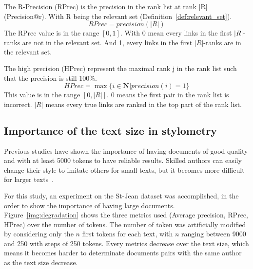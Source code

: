 \begin{definition}
  The R-Precision (RPrec) is the precision in the rank list at rank |R| (Precision@r).
  With R being the relevant set (Definition~\ref{def:relevant_set}).
  \begin{equation}
    RPrec = precision(|R|)
  \end{equation}
  The RPrec value is in the range $\left[0, 1\right]$.
  With 0 mean every links in the first $|R|$-ranks are not in the relevant set.
  And 1, every links in the first $|R|$-ranks are in the relevant set.
\end{definition}

\begin{definition}
  The high precision (HPrec) represent the maximal rank j in the rank list such that the precision is still 100\%.
  \begin{equation}
    HPrec = \max\{i \in \mathbf{N} | precision(i) = 1\}
  \end{equation}
  This value is in the range $\left[0, |R|\right]$.
  $0$ means the first pair in the rank list is incorrect.
  $|R|$ means every true links are ranked in the top part of the rank list.
\end{definition}

\subsection{Importance of the text size in stylometry}

Previous studies have shown the importance of having documents of good quality and with at least 5000 tokens to have reliable results.
Skilled authors can easily change their style to imitate others for small texts, but it becomes more difficult for larger texts~\cite{savoy_stylo}.

For this study, an experiment on the St-Jean dataset was accomplished, in the order to show the importance of having large documents.
Figure~\ref{img:degradation} shows the three metrics used (Average precision, RPrec, HPrec) over the number of tokens.
The number of token was artificially modified by considering only the $n$ first tokens for each text, with $n$ ranging between 9000 and 250 with steps of 250 tokens.
Every metrics decrease over the text size, which means it becomes harder to determinate documents pairs with the same author as the text size decrease.


